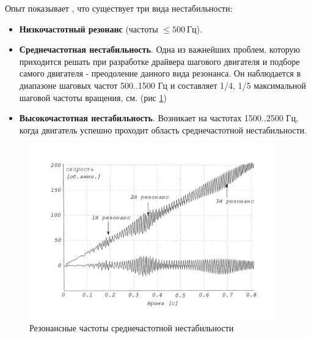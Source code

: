 Опыт показывает \cite[гл. 9]{RatmirovIvobotenko}, что существует три вида нестабильности:
\begin{itemize}
    \item \textbf{Низкочастотный резонанс} (частоты $ \le 500 ~\text{Гц}$).

    \item \textbf{Среднечастотная нестабильность}. Одна из важнейших проблем, которую приходится решать при
            разработке драйвера шагового двигателя и подборе самого двигателя - преодоление данного
            вида резонанса. Он наблюдается в диапазоне шаговых частот 500..1500 Гц и составляет
            1/4, 1/5 максимальной шаговой частоты вращения, см. (рис \ref{pic_step_motor_reisonance_plot})

    \item \textbf{Высокочастотная нестабильность}. Возникает на частотах 1500..2500 Гц, когда двигатель успешно
            проходит область среднечастотной нестабильности.
\end{itemize}

\begin{figure}
    \centering
    \includegraphics[width=0.95\textwidth, keepaspectratio]{./src/pictures/step_motor_reisonance_plot}
    \caption{Резонансные частоты среднечастотной нестабильности}
    \label{pic_step_motor_reisonance_plot}
\end{figure}


